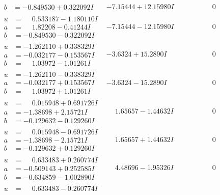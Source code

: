 \documentclass[1p]{elsarticle_modified}
\theoremstyle{definition}
\begin{document}
$$\begin{array}{c|c|c}
\begin{aligned}
b &= -0.849530 + 0.322092 I\end{aligned}
 & -7.15444 + 12.15980 I & \phantom{-0.000000 } 0 \\ \hline\begin{aligned}
u &= \phantom{-}0.533187 - 1.180110 I \\
a &= \phantom{-}1.82208 - 0.41244 I \\
b &= -0.849530 - 0.322092 I\end{aligned}
 & -7.15444 - 12.15980 I & \phantom{-0.000000 } 0 \\ \hline\begin{aligned}
u &= -1.262110 + 0.338329 I \\
a &= -0.032177 - 0.153567 I \\
b &= \phantom{-}1.03972 - 1.01261 I\end{aligned}
 & -3.6324 + 15.2890 I & \phantom{-0.000000 } 0 \\ \hline\begin{aligned}
u &= -1.262110 - 0.338329 I \\
a &= -0.032177 + 0.153567 I \\
b &= \phantom{-}1.03972 + 1.01261 I\end{aligned}
 & -3.6324 - 15.2890 I & \phantom{-0.000000 } 0 \\ \hline\begin{aligned}
u &= \phantom{-}0.015948 + 0.691726 I \\
a &= -1.38698 + 2.15721 I \\
b &= -0.129632 - 0.129260 I\end{aligned}
 & \phantom{-}1.65657 - 1.44632 I & \phantom{-0.000000 } 0 \\ \hline\begin{aligned}
u &= \phantom{-}0.015948 - 0.691726 I \\
a &= -1.38698 - 2.15721 I \\
b &= -0.129632 + 0.129260 I\end{aligned}
 & \phantom{-}1.65657 + 1.44632 I & \phantom{-0.000000 } 0 \\ \hline\begin{aligned}
u &= \phantom{-}0.633483 + 0.260774 I \\
a &= -0.509143 + 0.252585 I \\
b &= -0.634859 - 1.002890 I\end{aligned}
 & \phantom{-}4.48696 - 1.95326 I & \phantom{-0.000000 } 0 \\ \hline\begin{aligned}
u &= \phantom{-}0.633483 - 0.260774 I \\

\end{aligned}
\end{array}$$
\end{document}
